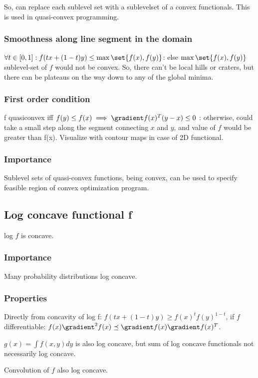 \documentclass[oneside, article]{memoir}
\begin{document}
So, can replace each sublevel set with a sublevelset of a convex functionals. This is used in quasi-convex programming.

\subsubsection{Smoothness along line segment in the domain}
$\forall t \in [0, 1]: f(tx + (1-t)y) \leq \max\set{f(x), f(y)}$: else $\max\set{f(x), f(y)}$ sublevel-set of $f$ would not be convex. So, there can't be local hills or craters, but there can be plateaus on the way down to any of the global minima.

\subsubsection{First order condition}
f quasiconvex iff $f(y) \leq f(x) \implies \gradient f(x)^{T}(y-x) \leq 0$ : otherwise, could take a small step along the segment connecting $x$ and $y$, and value of $f$ would be greater than f(x). Visualize with contour maps in case of 2D functional.

\subsubsection{Importance}
Sublevel sets of quasi-convex functions, being convex, can be used to specify feasible region of convex optimization program.

\subsection{Log concave functional f}
log $f$ is concave.

\subsubsection{Importance}
Many probability distributions log concave.

\subsubsection{Properties}
Directly from concavity of log f: $f(tx + (1-t)y) \geq f(x)^{t}f(y)^{1-t} $, if $f$ differentiable: $f(x)\gradient^{2}f(x) \preceq \gradient f(x) \gradient f(x)^{T}$.

$g(x) = \int f(x, y)dy$ is also log concave, but sum of log concave functionals not necessarily log concave.

Convolution of $f$ also log concave.
\end{document}
